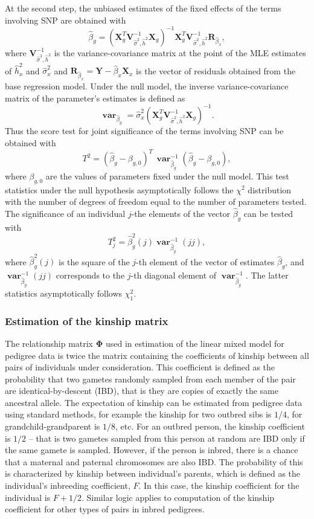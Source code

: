 \documentclass[12pt,a4paper]{article}
\DeclareMathOperator{\var}{\mathbf{var}}
\begin{document}
At the second step, the unbiased estimates of the fixed effects of the terms
involving SNP are obtained with
$$
\hat{\beta}_g = (\mathbf{X}^T_g
\mathbf{V}^{-1}_{\hat{\sigma}^2,\hat{h}^2}
\mathbf{X}_g)^{-1}
\mathbf{X}^T_g \mathbf{V}^{-1}_{\hat{\sigma}^2,\hat{h}^2}
\mathbf{R}_{\hat{\beta}_x},
$$
where $\mathbf{V}^{-1}_{\hat{\sigma}^2,\hat{h}^2}$ is the variance-covariance matrix at the point
of the MLE estimates of $\hat{h}^2_x$ and $\hat{\sigma}^2_x$ and
$\mathbf{R}_{\hat{\beta}_x} = \mathbf{Y} - \hat{\beta}_x \mathbf{X}_x$ is the
vector of residuals obtained from the base regression model. Under the null
model, the inverse variance-covariance matrix of the parameter's estimates is defined
as
$$
\var_{\hat{\beta}_g} = \hat{\sigma}^2_x (\mathbf{X}^T_g \mathbf{V}^{-1}_{\hat{\sigma}^2,\hat{h}^2} \mathbf{X}_g)^{-1}.
$$
Thus the score test for joint significance of the terms involving SNP can be obtained with
$$
T^2 = (\hat{\beta}_g - \beta_{g,0})^T \,
\var_{\hat{\beta}_g}^{-1} (\hat{\beta}_g - \beta_{g,0}),
$$
where $\beta_{g,0}$ are the values of parameters fixed under the null model.
This test statistics under the null hypothesis asymptotically follows the
$\chi^2$ distribution with the number of degrees
of freedom equal to the number of parameters tested.
The significance of an individual $j$-the elements of the vector
$\hat{\beta}_g$ can be tested with
$$
T^2_j = \hat{\beta}_{g}^2(j) \var_{\hat{\beta}_g}^{-1}(jj),
$$
where $\hat{\beta}_{g}^2(j)$ is the square of the $j$-th element of
the vector of estimates $\hat{\beta}_{g}$, and
$\var_{\hat{\beta}_g}^{-1}(jj)$ corresponds to the $j$-th diagonal
element of $\var_{\hat{\beta}_g}^{-1}$. The latter statistics
asymptotically follows $\chi^2_1$.

\subsubsection{Estimation of the kinship matrix}
\label{kinship}

The relationship matrix $\mathbf{\Phi}$ used in estimation of the
linear mixed model for pedigree data is twice the matrix containing
the coefficients of kinship between all pairs of individuals under consideration.
This coefficient is defined as the probability that two gametes randomly sampled
from each member of the pair are identical-by-descent (IBD), that is they are copies
of exactly the same ancestral allele. The expectation of kinship
can be estimated from pedigree data using standard methods, for example the
kinship for two outbred sibs is $1/4$, for grandchild-grandparent is $1/8$, etc.
For an outbred person, the kinship coefficient is $1/2$ -- that is two gametes
sampled from this person at random are IBD only if the same gamete is
sampled. However, if the person is inbred, there is a chance that a maternal
and paternal chromosomes are also IBD. The probability of this is characterized
by kinship between individual's parents, which is defined as the individual's
inbreeding coefficient, $F$. In this case, the kinship coefficient for the
individual is $F + 1/2$. Similar logic applies to computation of the kinship
coefficient for other types of pairs in inbred pedigrees.
\end{document}
